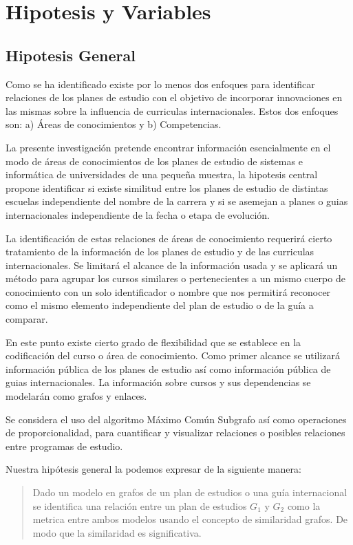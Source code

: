 \chapter{Hipotesis y Variables}


\section{Hipotesis General}

Como se ha identificado existe por lo menos dos enfoques para identificar relaciones de los planes de estudio con el objetivo de incorporar innovaciones en las mismas sobre la influencia de curriculas internacionales. Estos dos enfoques son: a) Áreas de conocimientos y b) Competencias. 

La presente investigación pretende encontrar información esencialmente en el modo de áreas de conocimientos de los planes de estudio de sistemas e informática de universidades de una pequeña muestra, la hipotesis central propone identificar si existe similitud entre los planes de estudio de distintas escuelas independiente del nombre de la carrera y si se asemejan a planes o guias internacionales independiente de la fecha o etapa de evolución. 

La identificación de estas relaciones de áreas de conocimiento requerirá cierto tratamiento de la información de los planes de estudio y de las curriculas internacionales. Se limitará el alcance de la información usada y se aplicará un método para agrupar los cursos similares o pertenecientes a un mismo cuerpo de conocimiento con un solo identificador o  nombre que nos permitirá reconocer como el mismo elemento independiente del plan de estudio o de la guía a comparar. 

En este punto existe cierto grado de flexibilidad que se establece en la codificación del curso o área de conocimiento. Como primer alcance se utilizará información pública de los planes de estudio así como información pública de guias internacionales. La información sobre cursos y sus dependencias se modelarán como grafos y enlaces.

Se considera el uso del algoritmo Máximo Común Subgrafo así como operaciones de proporcionalidad, para cuantificar y visualizar relaciones o posibles relaciones entre programas de estudio. 

Nuestra hipótesis general la podemos expresar de la siguiente manera:

\blockquote{

	Dado un modelo en grafos de un plan de estudios o una guía internacional se identifica una relación entre un plan de estudios $G_1$ y $G_2$ como la metrica entre ambos modelos usando el concepto de similaridad grafos. De modo que la similaridad es significativa. 

}

